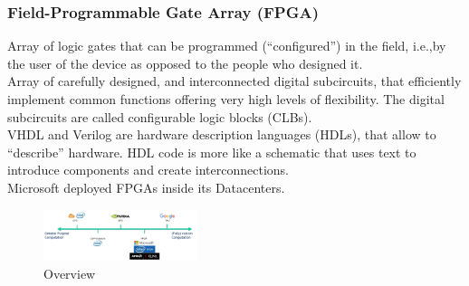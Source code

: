 \documentclass[10pt, oneside]{article}
\begin{document}
\subsubsection{Field-Programmable Gate Array (FPGA)}
Array of logic gates that can be programmed (“configured”) in the field, i.e.,by the user of the device as opposed to the people who designed it.\\ Array of carefully designed, and interconnected digital subcircuits, that efficiently implement common functions offering very high levels of flexibility. The digital subcircuits are called configurable logic blocks (CLBs).\\VHDL and Verilog are hardware description languages (HDLs), that allow to “describe” hardware. HDL code is more like a schematic that uses text to introduce components and create interconnections.\\Microsoft deployed FPGAs inside its Datacenters.
\begin{figure}[H]
    \begin{center}
    \includegraphics[width=0.4\textwidth]{img/img11.png}
    \caption{Overview}
    \label{fig:Overview}
    \end{center}
\end{figure}
\end{document}
